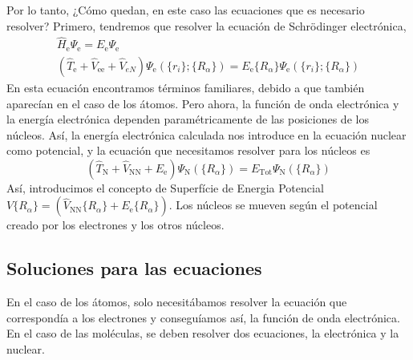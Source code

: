 \documentclass{tufte-book}
\begin{document}
Por lo tanto, ¿Cómo quedan, en este caso las ecuaciones que 
es necesario resolver? Primero, tendremos que resolver la 
ecuación de Schrödinger electrónica,
\begin{gather}
    \hat{H}_\mathrm{e}\Psi_\mathrm{e}=E_\mathrm{e}\Psi_\mathrm{e}\\ 
    (\hat{T}_\mathrm{e} + \hat{V}_\mathrm{ee} +\hat{V}_{eN})\Psi_\mathrm{e}(\{r_i\};\{R_\alpha\})
    = E_\mathrm{e}\{R_\alpha\}\Psi_\mathrm{e}(\{r_i\};\{R_\alpha\})
\end{gather}
En esta ecuación encontramos términos familiares, debido a que
también aparecían en el caso de los átomos. Pero ahora, la función
de onda electrónica y la energía electrónica dependen 
paramétricamente de las posiciones de los núcleos. Así, la energía
electrónica calculada nos introduce en la ecuación nuclear como
potencial, y la ecuación que necesitamos resolver para los núcleos
es
\begin{equation}
    (\hat{T}_\mathrm{N} + \hat{V}_\mathrm{NN} +E_\mathrm{e})\Psi_\mathrm{N}(\{R_\alpha\})
    = E_\mathrm{Tot}\Psi_\mathrm{N}(\{R_\alpha\})
\end{equation}
Así, introducimos el concepto de Superfície de Energia Potencial $V\{R_\alpha\}=(\hat{V}_\mathrm{NN}\{R_\alpha\}+E_\mathrm{e}\{R_\alpha\})$. Los núcleos se mueven según el potencial creado por los electrones y los otros núcleos.

\subsection{Soluciones para las ecuaciones}
En el caso de los átomos, solo necesitábamos  resolver la ecuación que correspondía a los electrones y conseguíamos así, la función de onda electrónica. En el caso de las moléculas, se deben resolver dos ecuaciones, la electrónica y la nuclear.
\end{document}

